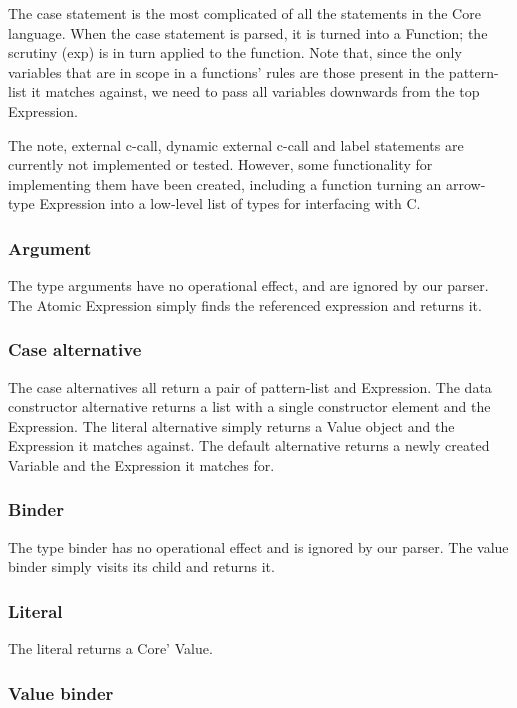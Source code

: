 The case statement is the most complicated of all the statements in the Core language.
When the case statement is parsed, it is turned into a Function; the scrutiny (exp) 
is in turn applied to the function. Note that, since the only variables that are in
scope in a functions' rules are those present in the pattern-list it matches against, 
we need to pass all variables downwards from the top Expression.

The note, external c-call, dynamic external c-call and label statements are currently
not implemented or tested. However, some functionality for implementing them have been
created, including a function turning an arrow-type Expression into a low-level list
of types for interfacing with C.

\subsubsection*{Argument}

The type arguments have no operational effect, and are ignored by our parser.
The Atomic Expression simply finds the referenced expression and returns it.

\subsubsection*{Case alternative}

The case alternatives all return a pair of pattern-list and Expression. The
data constructor alternative returns a list with a single constructor element and
the Expression. The literal alternative simply returns a Value object and the 
Expression it matches against. The default alternative returns a newly created
Variable and the Expression it matches for.

\subsubsection*{Binder}

The type binder has no operational effect and is ignored by our parser. The 
value binder simply visits its child and returns it.

\subsubsection*{Literal}

The literal returns a Core' Value.


\subsubsection*{Value binder}

